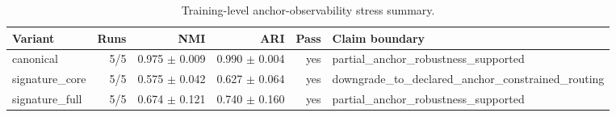 \begin{table}[H]
\centering
\footnotesize
\setlength{\tabcolsep}{5pt}
\renewcommand{\arraystretch}{1.08}
\caption{Training-level anchor-observability stress summary.}
\begin{tabular}{lrrrrl}
\toprule
Variant & Runs & NMI & ARI & Pass & Claim boundary \\
\midrule
canonical & 5/5 & 0.975 $\pm$ 0.009 & 0.990 $\pm$ 0.004 & yes & partial\_anchor\_robustness\_supported \\
signature\_core & 5/5 & 0.575 $\pm$ 0.042 & 0.627 $\pm$ 0.064 & yes & downgrade\_to\_declared\_anchor\_constrained\_routing \\
signature\_full & 5/5 & 0.674 $\pm$ 0.121 & 0.740 $\pm$ 0.160 & yes & partial\_anchor\_robustness\_supported \\
\bottomrule
\end{tabular}
\end{table}
